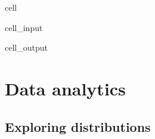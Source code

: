 \documentclass[letterpaper,10pt,english]{jupyterBook}
\begin{document}
\begin{sphinxuseclass}{cell}
\begin{sphinxVerbatimInput}
\begin{sphinxuseclass}{cell_input}
\end{sphinxuseclass}\end{sphinxVerbatimInput}
\begin{sphinxVerbatimOutput}

\begin{sphinxuseclass}{cell_output}
\noindent{}

\end{sphinxuseclass}\end{sphinxVerbatimOutput}

\end{sphinxuseclass}

\section{Data analytics}
\label{\detokenize{Lecture 3:data-analytics}}\label{\detokenize{Lecture 3::doc}}

\subsection{Exploring distributions}
\label{\detokenize{Lecture 3:exploring-distributions}}
\end{document}
